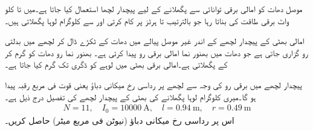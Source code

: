 موصل دھات کو امالی برقی توانائی سے پگھلانے کے لیے پیچدار لچھا استعمال کیا جاتا ہے۔میں      تا   کلو واٹ برقی طاقت کی بناتا رہا جو بالترتیب   تا   ہرٹز پر کام کرتی اور   سے   کلوگرام  لوہا پگھلاتی ہیں۔

امالی  بھٹی کے پیچدار لچھے کے اندر غیر موصل پیالے  میں  دھات کے ٹکڑے ڈال کر لچھے میں بدلتی رو گزاری جاتی ہے جو دھات میں بھنور نما امالی برقی رو پیدا کرتی ہے۔  بھنور نما رو دھات کو  گرم کر کے پگھلاتی ہے۔امالی برقی بھٹی میں لوہے کو   ڈگری  تک گرم کیا جاتا ہے۔

پیچدار لچھے میں برقی رو  کی وجہ سے لچھے پر  رداسی رخ میکانی دباؤ یعنی قوت فی مربع رقبہ پیدا ہو گا۔میری  کلوگرام لوہا پگھلانے کی بھٹی کے پیچدار لچھے کی تفصیل درج ذیل ہے۔
\begin{align*}
N=11, \quad I_0=\SI{10000}{\ampere}, \quad l=\SI{0.94}{\meter}, \quad r=\SI{0.49}{\meter}
\end{align*}
اس پر رداسی رخ میکانی دباؤ  (نیوٹن فی مربع میٹر)  حاصل کریں۔


